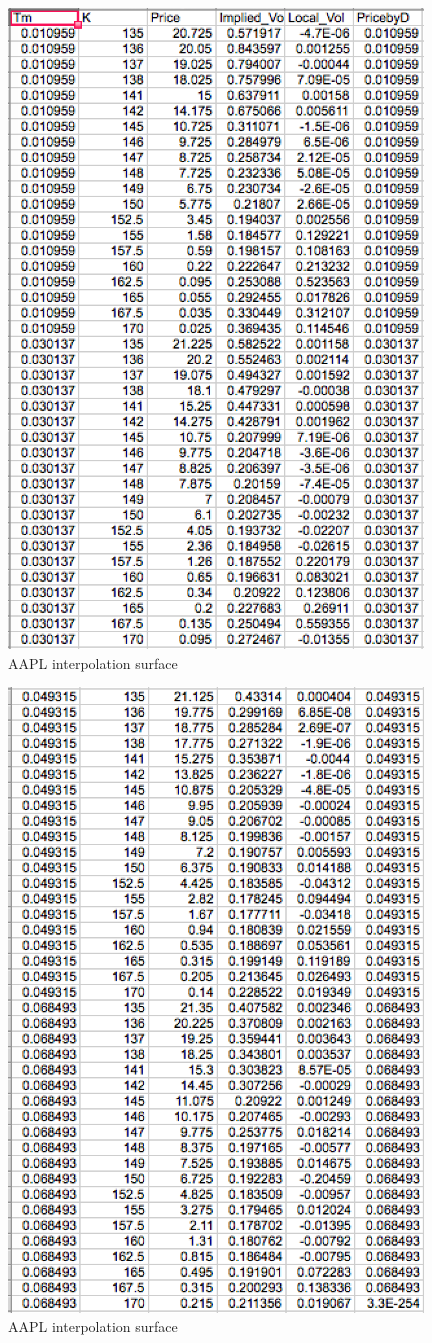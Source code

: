 \documentclass{article}
\begin{document}
\begin{figure}[h] 
\begin{center} 
\includegraphics[width = 11cm]{A1.png}  
\caption{AAPL interpolation surface} 
\end{center} 
\end{figure}

\begin{figure}[h] 
\begin{center} 
\includegraphics[width = 11cm]{A2.png}  
\caption{AAPL interpolation surface} 
\end{center} 
\end{figure}
\end{document}
